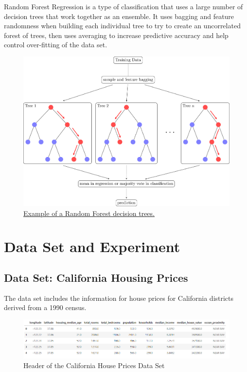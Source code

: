 \documentclass{article}
\begin{document}
Random Forest Regression is a type of classification that uses a large number of decision trees that work together as an ensemble. It uses bagging and feature randomness when building each individual tree to try to create an uncorrelated forest of trees, then uses averaging to increase predictive accuracy and help control over-fitting of the data set.

\begin{figure}[H]
\centering
\includegraphics[width=12.0cm]{random-forest.png}
\caption{\label{fig:random-forest}\href{https://tikz.net/random-forest/}{Example of a Random Forest decision trees.}}
\end{figure}

\section{Data Set and Experiment}

\subsection{Data Set: California Housing Prices}

The data set includes the information for house prices for California districts derived from a 1990 census.

\begin{figure}[H]
\includegraphics[width=15.0cm]{Images/dataset_columns.png}
\caption{\label{fig:dataset_columns}Header of the California House Prices Data Set}
\end{figure}
\end{document}
